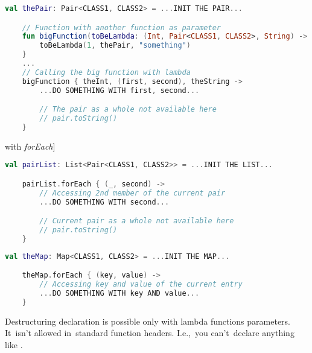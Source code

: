 \begin{lstlisting}[language=Kotlin]
    val thePair: Pair<CLASS1, CLASS2> = ...INIT THE PAIR...

    // Function with another function as parameter
    fun bigFunction(toBeLambda: (Int, Pair<CLASS1, CLASS2>, String) -> Unit) {
        toBeLambda(1, thePair, "something")
    }
    ...
    // Calling the big function with lambda
    bigFunction { theInt, (first, second), theString ->
        ...DO SOMETHING WITH first, second...

        // The pair as a whole not available here
        // pair.toString()
    }
\end{lstlisting}

\example[alternative to~the~mentioned \hyperref[kotlindestdeclforloop]{\textit{for} loop} with \textit{forEach}]
\begin{lstlisting}[language=Kotlin]
    val pairList: List<Pair<CLASS1, CLASS2>> = ...INIT THE LIST...

    pairList.forEach { (_, second) ->
        // Accessing 2nd member of the current pair
        ...DO SOMETHING WITH second...

        // Current pair as a whole not available here
        // pair.toString()
    }
\end{lstlisting}

\begin{lstlisting}[language=Kotlin]
    val theMap: Map<CLASS1, CLASS2> = ...INIT THE MAP...

    theMap.forEach { (key, value) ->
        // Accessing key and value of the current entry
        ...DO SOMETHING WITH key AND value...
    }
\end{lstlisting}

\warning Destructuring declaration is possible only with lambda functions parameters.
It~isn't allowed in~standard function headers.
I.e.,~you can't~declare anything like .
